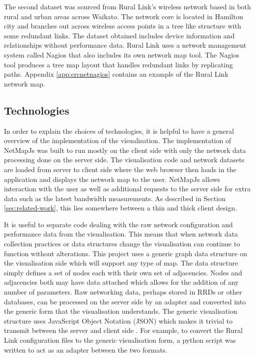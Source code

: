 \documentclass[11pt, a4paper]{article}
\begin{document}
The second dataset was sourced from Rural Link's wireless network based in both
rural and urban areas across Waikato. The network core is located in Hamilton
city and branches out across wireless access points in a tree like structure
with some redundant links. The dataset obtained includes device information and
relationships without performance data. Rural Link uses a network management
system called Nagios that also includes its own network map tool. The Nagios
tool produces a tree map layout that handles redundant links by replicating
paths. Appendix \ref{app:crcnetnagios} contains an example of the Rural Link
network map. 


\subsection{Technologies}
\label{sec:technologies}

In order to explain the choices of technologies, it is helpful to have a general
overview of the implementation of the visualisation. The implementation of
NetMapJs was built to run mostly on the client side with only the network data
processing done on the server side. The visualisation code and network datasets
are loaded from server to client side where the web browser then loads in the
application and displays the network map to the user. NetMapJs allows
interaction with the user as well as additional requests to the server side for
extra data such as the latest bandwidth measurements. As described in Section
\ref{sec:related-work}, this lies somewhere between a thin and thick client
design.

It is useful to separate code dealing with the raw network configuration and
performance data from the visualisation. This means that when network data
collection practices or data structures change the visualisation can continue to
function without alterations. This project uses a generic graph data structure
on the visualisation side which will support any type of map. The data structure
simply defines a set of nodes each with their own set of adjacencies.  Nodes and
adjacencies both may have data attached which allows for the addition of any
number of parameters. Raw networking data, perhaps stored in RRDs or other
databases, can be processed on the server side by an adapter and converted into
the generic form that the visualisation understands. The generic visualisation
structure uses JavaScript Object Notation (JSON) which makes it trivial to
transmit between the server and client side \cite{rfc4627}. For example, to
convert the Rural Link configuration files to the generic visualisation form, a
python script was written to act as an adapter between the two formats. 
\end{document}
